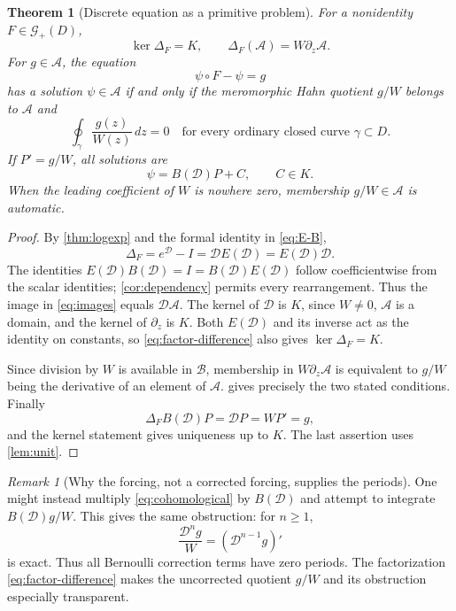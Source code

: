 \documentclass[11pt,a4paper]{article}
\numberwithin{equation}{section}
\newtheorem{theorem}{Theorem}[section]
\theoremstyle{definition}
\theoremstyle{remark}
\newtheorem{remark}[remark]{Remark}
\newcommand{\A}{\mathcal A}
\newcommand{\G}{\mathcal G}
\newcommand{\DD}{\mathscr D}
\begin{document}
\begin{theorem}[Discrete equation as a primitive problem]
\label{thm:difference}
For a nonidentity $F\in\G_+(D)$,
\begin{equation}\label{eq:images}
 \ker\Delta_F=K,\qquad
 \Delta_F(\A)=W\partial_z\A.
\end{equation}
For $g\in\A$, the equation
\begin{equation}\label{eq:cohomological}
 \psi\circ F-\psi=g
\end{equation}
has a solution $\psi\in\A$ if and only if the meromorphic Hahn quotient
$g/W$ belongs to $\A$ and
\begin{equation}\label{eq:periodcondition}
 \oint_\gamma\frac{g(z)}{W(z)}\,dz=0
 \quad\text{for every ordinary closed curve }\gamma\subset D.
\end{equation}
If $P' =g/W$, all solutions are
\begin{equation}\label{eq:bernoulli-solver}
 \psi=B(\DD)P+C,\qquad C\in K.
\end{equation}
When the leading coefficient of $W$ is nowhere zero, membership $g/W\in\A$
is automatic.
\end{theorem}

\begin{proof}
By \cref{thm:logexp} and the formal identity in \eqref{eq:E-B},
\begin{equation}\label{eq:factor-difference}
 \Delta_F=e^{\DD}-I=\DD E(\DD)=E(\DD)\DD.
\end{equation}
The identities $E(\DD)B(\DD)=I=B(\DD)E(\DD)$ follow coefficientwise
from the scalar identities; \cref{cor:dependency} permits every
rearrangement.  Thus the image in \eqref{eq:images} equals $\DD\A$.
The kernel of $\DD$ is $K$, since $W\ne0$, $\A$ is a domain, and the
kernel of $\partial_z$ is $K$.  Both $E(\DD)$ and its inverse act as the
identity on constants, so \eqref{eq:factor-difference} also gives
$\ker\Delta_F=K$.

Since division by $W$ is available in $\mathcal B$, membership in
$W\partial_z\A$ is equivalent to $g/W$ being the derivative of an
element of $\A$.   gives precisely the two stated
conditions.  Finally
\[
 \Delta_F B(\DD)P=\DD P=W P'=g,
\]
and the kernel statement gives uniqueness up to $K$.  The last assertion
uses \cref{lem:unit}.
\end{proof}

\begin{remark}[Why the forcing, not a corrected forcing, supplies the periods]
One might instead multiply \eqref{eq:cohomological} by $B(\DD)$ and
attempt to integrate $B(\DD)g/W$.  This gives the same obstruction:
for $n\geq1$,
\[
 \frac{\DD^n g}{W}=(\DD^{n-1}g)'
\]
is exact.  Thus all Bernoulli correction terms have zero periods.  The
factorization \eqref{eq:factor-difference} makes the uncorrected quotient
$g/W$ and its obstruction especially transparent.
\end{remark}
\end{document}
